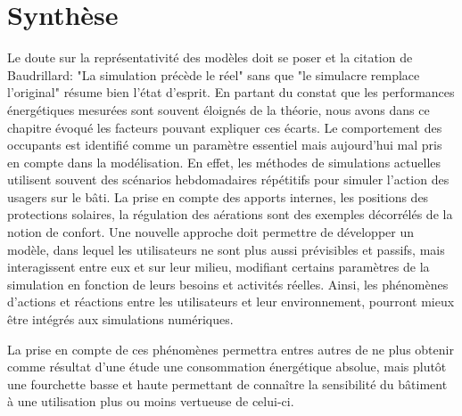 \section{Synthèse}

Le doute sur la représentativité des modèles doit se poser et la citation de Baudrillard: "La simulation précède le réel" sans que "le simulacre remplace l'original" résume bien l'état d'esprit. En partant du constat que les performances énergétiques mesurées sont souvent éloignés de la théorie, nous avons dans ce chapitre évoqué les facteurs pouvant expliquer ces écarts. Le comportement des occupants est identifié comme un paramètre essentiel mais aujourd'hui mal pris en compte dans la modélisation. En effet, les méthodes de simulations actuelles utilisent souvent des scénarios hebdomadaires répétitifs pour simuler l'action des usagers sur le bâti. La prise en compte des apports internes, les positions des protections solaires, la régulation des aérations sont des exemples décorrélés de la notion de confort. Une nouvelle approche doit permettre de développer un modèle, dans lequel les utilisateurs ne sont plus aussi prévisibles et passifs, mais interagissent entre eux et sur leur milieu, modifiant certains paramètres de la simulation en fonction de leurs besoins et activités réelles. Ainsi, les phénomènes d'actions et réactions entre les utilisateurs et leur environnement, pourront mieux être intégrés aux simulations numériques.

La prise en compte de ces phénomènes permettra entres autres de ne plus obtenir comme résultat d'une étude une consommation énergétique absolue, mais plutôt une fourchette basse et haute permettant de connaître la sensibilité du bâtiment à une utilisation plus ou moins vertueuse de celui-ci.